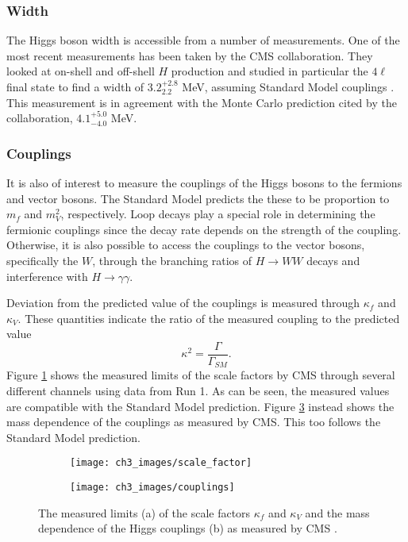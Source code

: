 \documentclass[10pt,a4paper]{book}
\begin{document}
\subsubsection{Width}
The Higgs boson width is accessible from a number of measurements. One of the most recent measurements has been taken by the CMS collaboration. They looked at on-shell and off-shell $H$ production and studied in particular the $4\ell$ final state to find a width of $3.2^{+2.8}_{2.2}$ MeV, assuming Standard Model couplings \cite{CMS:2019ekd}. This measurement is in agreement with the Monte Carlo prediction cited by the collaboration, $4.1^{+5.0}_{-4.0}$ MeV.

\subsubsection{Couplings}
It is also of interest to measure the couplings of the Higgs bosons to the fermions and vector bosons. The Standard Model predicts the these to be proportion to $m_f$ and $m_{V}^2$, respectively. Loop decays play a special role in determining the fermionic couplings since the decay rate depends on the strength of the coupling. Otherwise, it is also possible to access the couplings to the vector bosons, specifically the $W$, through the branching ratios of $H \rightarrow WW$ decays and interference with $H \rightarrow \gamma\gamma$.

Deviation from the predicted value of the couplings is measured through $\kappa_f$ and $\kappa_V$. These quantities indicate the ratio of the measured coupling to the predicted value
\begin{equation}
\kappa^2 = \frac{\Gamma}{\Gamma_{SM}}.
\end{equation}
Figure \ref{scale factor} shows the measured limits of the scale factors by CMS through several different channels using data from Run 1. As can be seen, the measured values are compatible with the Standard Model prediction. Figure \ref{mass dependence} instead shows the mass dependence of the couplings as measured by CMS. This too follows the Standard Model prediction. 

\begin{figure}
\begin{subfigure}{.5\textwidth}
\centering
\texttt{[image: ch3\_images/scale\_factor]}
\caption{}
\label{scale factor}
\end{subfigure}
\begin{subfigure}{.5\textwidth}
\texttt{[image: ch3\_images/couplings]}
\caption{}
\label{mass dependence}
\end{subfigure}
\caption{The measured limits (a) of the scale factors $\kappa_f$ and $\kappa_V$ and the mass dependence of the Higgs couplings (b) as measured by CMS \cite{higgs_review}. }
\end{figure}
\end{document}
